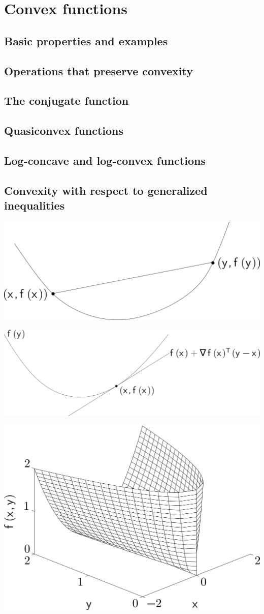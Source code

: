 \chapter{Convex functions}

\clearpage
\section{Basic properties and examples}

\clearpage
\section{Operations that preserve convexity}

\clearpage
\section{The conjugate function}

\clearpage
\section{Quasiconvex functions}

\clearpage
\section{Log-concave and log-convex functions}

\clearpage
\section{Convexity with respect to generalized inequalities}


\clearpage
\hfil\includegraphics[width=.5\textwidth]{../Graphics/067.png}\hfil

\clearpage
\hfil\includegraphics[width=.5\textwidth]{../Graphics/069.png}\hfil

\clearpage
\hfil\includegraphics[width=.5\textwidth]{../Graphics/072.png}\hfil

